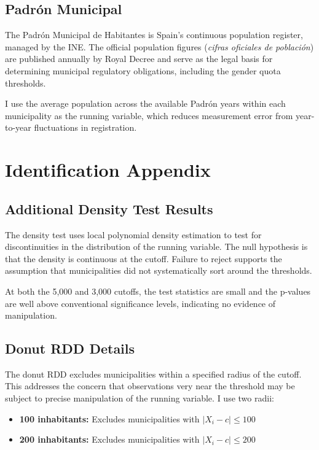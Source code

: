 \documentclass[12pt]{article}
\begin{document}
\subsection{Padr\'{o}n Municipal}

The Padr\'{o}n Municipal de Habitantes is Spain's continuous population register, managed by the INE. The official population figures (\emph{cifras oficiales de poblaci\'{o}n}) are published annually by Royal Decree and serve as the legal basis for determining municipal regulatory obligations, including the gender quota thresholds.

I use the average population across the available Padr\'{o}n years within each municipality as the running variable, which reduces measurement error from year-to-year fluctuations in registration.


\section{Identification Appendix}

\subsection{Additional Density Test Results}

The \citet{cattaneo2020simple} density test uses local polynomial density estimation to test for discontinuities in the distribution of the running variable. The null hypothesis is that the density is continuous at the cutoff. Failure to reject supports the assumption that municipalities did not systematically sort around the thresholds.

At both the 5,000 and 3,000 cutoffs, the test statistics are small and the p-values are well above conventional significance levels, indicating no evidence of manipulation.

\subsection{Donut RDD Details}

The donut RDD excludes municipalities within a specified radius of the cutoff. This addresses the concern that observations very near the threshold may be subject to precise manipulation of the running variable. I use two radii:

\begin{itemize}
    \item \textbf{100 inhabitants:} Excludes municipalities with $|X_i - c| \leq 100$
    \item \textbf{200 inhabitants:} Excludes municipalities with $|X_i - c| \leq 200$
\end{itemize}
\end{document}
